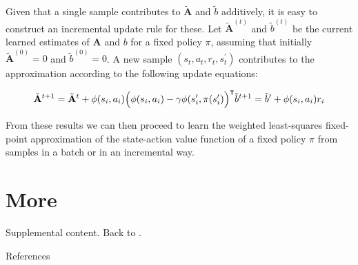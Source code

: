 \documentclass[9pt]{beamer} %
\begin{document}
\begin{frame}
Given that a single sample contributes to $\tilde{\mathbf{A}}$ and $\tilde{b}$ additively, it is easy to construct an incremental update rule for these. Let $\tilde{\mathbf{A}}^{(t)}$ and $\tilde{b}^{(t)}$ be the current learned estimates of $\mathbf{A}$ and $b$ for a fixed policy $\pi$, assuming that initially $\tilde{\mathbf{A}}^{(0)} = 0$ and $\tilde{b}^{(0)} = 0$. A new sample
$(s_t, a_t, r_t,s^{\prime}_t)$ contributes to the approximation according to the following update equations:

\begin{equation}
\tilde{\mathbf{A}}^{t+1} = \tilde{\mathbf{A}}^{t} + \phi(s_i, a_i) \Big(\phi(s_i, a_i) - \gamma \phi(s_i^{\prime}, \pi(s_i^{\prime} )   \Big)^{\intercal}\\
\tilde{b}^{t+1} = \tilde{b}^{\prime} + \phi(s_i, a_i) r_i 
\end{equation}

From these results we can then proceed to learn the weighted least-squares
fixed-point approximation of the state-action value function of a fixed policy $\pi$ from samples in a batch or in an incremental way.  
\end{frame}

\appendix
\section{More}
\begin{frame}[label=supplemental]
Supplemental content.
Back to \hyperlink{main}{}.
\end{frame}



\begin{frame}{References}



  
\end{frame}  
  
\end{document}
